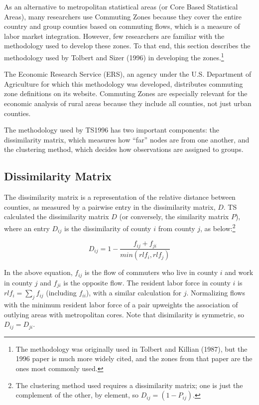 As an alternative to metropolitan statistical areas (or Core Based Statistical Areas), many researchers use Commuting Zones because they cover the entire country and group counties based on commuting flows, which is a measure of labor market integration. However, few researchers are familiar with the methodology used to develop these zones. To that end, this section describes the methodology used by Tolbert and Sizer (1996) in developing the zones.\footnote{The methodology was originally used in Tolbert and Killian (1987), but the 1996 paper is much more widely cited, and the zones from that paper are the ones most commonly used.}

The Economic Research Service (ERS), an agency under the U.S. Department of Agriculture for which this methodology was developed, distributes commuting zone definitions on its website. Commuting Zones are especially relevant for the economic analysis of rural areas because they include all counties, not just urban counties.

The methodology used by TS1996 has two important components: the dissimilarity matrix, which measures how ``far'' nodes are from one another, and the clustering method, which decides how observations are assigned to groups. 

\subsection{Dissimilarity Matrix}

The dissimilarity matrix is a representation of the relative distance between counties, as measured by a pairwise entry in the dissimilarity matrix, $D$. TS calculated the dissimilarity matrix $D$ (or conversely, the similarity matrix $P$), where an entry $D_{ij}$ is the dissimilarity of county $i$ from county $j$, as below:\footnote{The clustering method used requires a dissimilarity matrix; one is just the complement of the other, by element, so $D_{ij}=(1-P_{ij})$.}

\begin{equation}\label{eqn:diss}
D_{ij} = 1- \frac{f_{ij}+f_{ji}}{min(rlf_{i},rlf_j)}
\end{equation}

In the above equation, $f_{ij}$ is the flow of commuters who live in county $i$ and work in county $j$ and $f_{ji}$ is the opposite flow. The resident labor force in county $i$ is $rlf_i = \sum_j f_{ij}$ (including $f_{ii}$), with a similar calculation for $j$. Normalizing flows with the minimum resident labor force of a pair upweights the association of outlying areas with metropolitan cores. Note that disimilarity is symmetric, so $D_{ij}=D_{ji}$.

